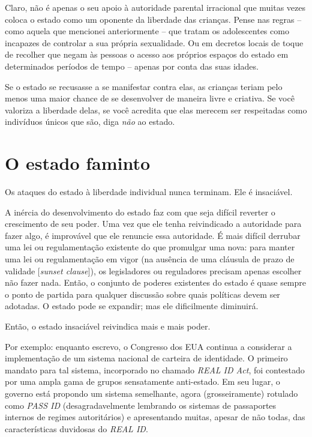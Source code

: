 Claro, não é apenas o seu apoio à autoridade parental irracional que muitas vezes coloca o estado como um oponente da liberdade das crianças. Pense nas regras -- como aquela que mencionei anteriormente -- que tratam os adolescentes como incapazes de controlar a sua própria sexualidade. Ou em decretos locais de toque de recolher que negam às pessoas o acesso aos próprios espaços do estado em determinados períodos de tempo -- apenas por conta das suas idades.

Se o estado se recusasse a se manifestar contra elas, as crianças teriam pelo menos uma maior chance de se desenvolver de maneira livre e criativa. Se você valoriza a liberdade delas, se você acredita que elas merecem ser respeitadas como indivíduos únicos que são, diga \emph{não} ao estado.

\section{O estado faminto}

Os ataques do estado à liberdade individual nunca terminam. Ele é insaciável.

A inércia do desenvolvimento do estado faz com que seja difícil reverter o crescimento de seu poder. Uma vez que ele tenha reivindicado a autoridade para fazer algo, é improvável que ele renuncie essa autoridade. É mais difícil derrubar uma lei ou regulamentação existente do que promulgar uma nova: para manter uma lei ou regulamentação em vigor (na ausência de uma cláusula de prazo de validade [\emph{sunset clause}]), os legisladores ou reguladores precisam apenas escolher não fazer nada. Então, o conjunto de poderes existentes do estado é quase sempre o ponto de partida para qualquer discussão sobre quais políticas devem ser adotadas. O estado pode se expandir; mas ele dificilmente diminuirá.

Então, o estado insaciável reivindica mais e mais poder.

Por exemplo: enquanto escrevo, o Congresso dos EUA continua a considerar a implementação de um sistema nacional de carteira de identidade. O primeiro mandato para tal sistema, incorporado no chamado \emph{REAL ID Act}, foi contestado por uma ampla gama de grupos sensatamente anti-estado. Em seu lugar, o governo está propondo um sistema semelhante, agora (grosseiramente) rotulado como \emph{PASS ID} (desagradavelmente lembrando os sistemas de passaportes internos de regimes autoritários) e apresentando muitas, apesar de não todas, das características duvidosas do \emph{REAL ID}.

